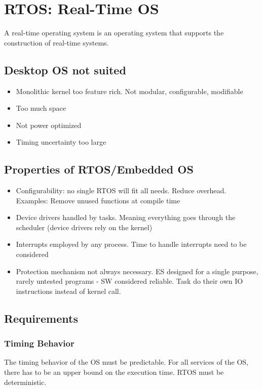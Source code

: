 
\section{RTOS: Real-Time OS}

\begin{definition}
A real-time operating system is an operating system that 
supports the construction of real-time systems.
\end{definition}

\subsection{Desktop OS not suited}
\begin{itemize}[noitemsep]
\item Monolithic kernel too feature rich. Not modular, configurable, modifiable
\item Too much space
\item Not power optimized
\item Timing uncertainty too large
\end{itemize}

\subsection{Properties of RTOS/Embedded OS}
\begin{itemize}[noitemsep]
\item Configurability: no single RTOS will fit all needs. Reduce overhead. Examples: Remove unused functions at compile time
\item Device drivers handled by tasks. Meaning everything goes through the scheduler (device drivers rely on the kernel)
\item Interrupts employed by any process. Time to handle interrupts need to be considered
\item Protection mechanism not always necessary. ES designed for a single purpose, rarely untested programs - SW considered reliable. Task do their own IO instructions instead of kernel call.
\end{itemize}

\subsection{Requirements}
\subsubsection{Timing Behavior}
The timing behavior of the OS must be predictable. For all services of the OS, there has to be an upper bound on the execution time. RTOS must be deterministic.

